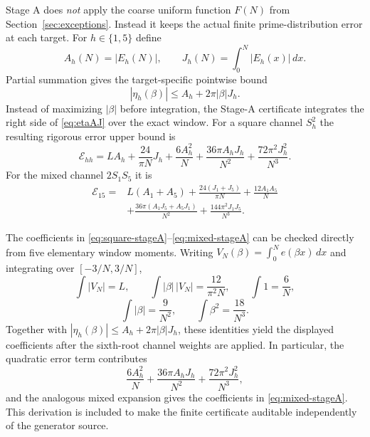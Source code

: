 \documentclass[11pt]{article}
\theoremstyle{definition}
\newcommand{\abs}[1]{\left|#1\right|}
\begin{document}
Stage A does \emph{not} apply the coarse uniform function $F(N)$ from Section~\ref{sec:exceptions}. Instead it keeps the actual finite prime-distribution error at each target. For $h\in\{1,5\}$ define
\begin{equation}\label{eq:AhJh}
A_h(N)=\abs{E_h(N)},\qquad
J_h(N)=\int_0^N\abs{E_h(x)}\,dx.
\end{equation}
Partial summation gives the target-specific pointwise bound
\begin{equation}\label{eq:etaAJ}
\abs{\eta_h(\beta)}\le A_h+2\pi\abs{\beta}J_h.
\end{equation}
Instead of maximizing $\abs{\beta}$ before integration, the Stage-A certificate integrates the right side of \eqref{eq:etaAJ} over the exact window. For a square channel $S_h^2$ the resulting rigorous error upper bound is
\begin{equation}\label{eq:square-stageA}
\mathcal E_{hh}=
LA_h+\frac{24}{\pi N}J_h
+\frac{6A_h^2}{N}
+\frac{36\pi A_hJ_h}{N^2}
+\frac{72\pi^2J_h^2}{N^3}.
\end{equation}
For the mixed channel $2S_1S_5$ it is
\begin{equation}\label{eq:mixed-stageA}
\begin{split}
\mathcal E_{15}={}&L(A_1+A_5)+\frac{24(J_1+J_5)}{\pi N}
+\frac{12A_1A_5}{N}\\
&+\frac{36\pi(A_1J_5+A_5J_1)}{N^2}
+\frac{144\pi^2J_1J_5}{N^3}.
\end{split}
\end{equation}

The coefficients in \eqref{eq:square-stageA}--\eqref{eq:mixed-stageA} can be checked directly from five elementary window moments. Writing $V_N(\beta)=\int_0^N e(\beta x)\,dx$ and integrating over $[-3/N,3/N]$,
\begin{equation}\label{eq:stageA-moments}
\int |V_N|=L,\qquad
\int |\beta|\,|V_N|=\frac{12}{\pi^2N},\qquad
\int1=\frac6N,
\end{equation}
\begin{equation}\label{eq:stageA-moments2}
\int|\beta|=\frac9{N^2},\qquad
\int\beta^2=\frac{18}{N^3}.
\end{equation}
Together with $|\eta_h(\beta)|\le A_h+2\pi|\beta|J_h$, these identities yield the displayed coefficients after the sixth-root channel weights are applied. In particular, the quadratic error term contributes
\[
\frac{6A_h^2}{N}+\frac{36\pi A_hJ_h}{N^2}+\frac{72\pi^2J_h^2}{N^3},
\]
and the analogous mixed expansion gives the coefficients in \eqref{eq:mixed-stageA}. This derivation is included to make the finite certificate auditable independently of the generator source.
\end{document}
